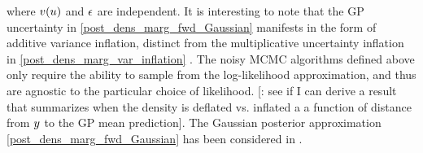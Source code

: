\documentclass[12pt]{article}
\begin{document}
where $v(u)$ and $\epsilon$ are independent. It is interesting to note that the GP uncertainty in 
\ref{post_dens_marg_fwd_Gaussian} manifests in the form of additive variance inflation, distinct 
from the multiplicative uncertainty inflation in \ref{post_dens_marg_var_inflation} \citep{GP_PDE_priors}.
The noisy MCMC algorithms defined above only require the ability to sample from the log-likelihood
approximation, and thus are agnostic to the particular choice of likelihood. 
[\todo: see if I can derive a result that summarizes when the density is deflated vs. inflated a a function 
of distance from $y$ to the GP mean prediction].  
The Gaussian posterior approximation \ref{post_dens_marg_fwd_Gaussian} has been considered in 
\cite{StuartTeck2, hydrologicalModel, GP_PDE_priors, GP_PDE_priors, CES, idealizedGCM, weightedIVAR}.


\end{document}
